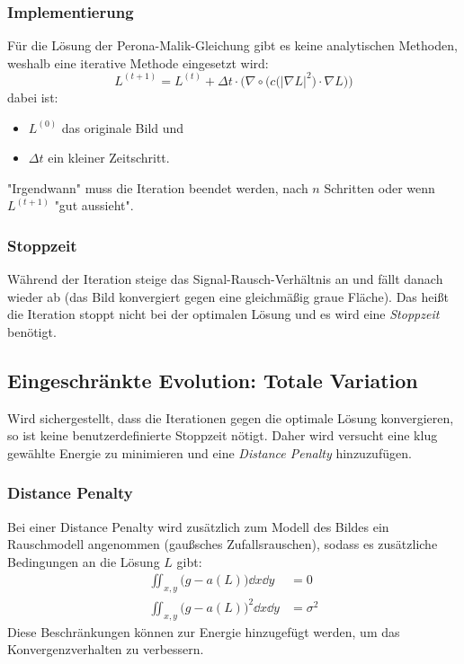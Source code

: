 			\subsubsection{Implementierung}
				Für die Lösung der Perona-Malik-Gleichung gibt es keine analytischen Methoden, weshalb eine iterative Methode eingesetzt wird:
				\begin{equation*}
					L^{(t + 1)} = L^{(t)} + \Delta t \cdot \bigg( \nabla \circ \Big( c\big(\lvert \nabla L \rvert^2\big) \cdot \nabla L \Big) \bigg)
				\end{equation*}
				dabei ist:
				\begin{itemize}
					\item \( L^{(0)} \) das originale Bild und
					\item \( \Delta t \) ein kleiner Zeitschritt.
				\end{itemize}
				"Irgendwann" muss die Iteration beendet werden, \zB nach \(n\) Schritten oder wenn \( L^{(t + 1)} \) "gut aussieht".

			\subsubsection{Stoppzeit}
				Während der Iteration steige das Signal-Rausch-Verhältnis \iA an und fällt danach wieder ab (das Bild konvergiert gegen eine gleichmäßig graue Fläche). Das heißt die Iteration stoppt nicht bei der optimalen Lösung und es wird eine \emph{Stoppzeit} benötigt.

		\subsection{Eingeschränkte Evolution: Totale Variation}
			Wird sichergestellt, dass die Iterationen gegen die optimale Lösung konvergieren, so ist keine benutzerdefinierte Stoppzeit nötigt. Daher wird versucht eine klug gewählte Energie zu minimieren und eine \emph{Distance Penalty} hinzuzufügen.

			\subsubsection{Distance Penalty}
				Bei einer Distance Penalty wird zusätzlich zum Modell des Bildes ein Rauschmodell angenommen (\zB gaußsches Zufallsrauschen), sodass es zusätzliche Bedingungen an die Lösung \(L\) gibt:
				\begin{align*}
					\iint_{x, y} \! \big( g - a(L) \big) \dd{x} \dd{y}   & = 0        \\
					\iint_{x, y} \! \big( g - a(L) \big)^2 \dd{x} \dd{y} & = \sigma^2
				\end{align*}
				Diese Beschränkungen können zur Energie hinzugefügt werden, um das Konvergenzverhalten zu verbessern.

